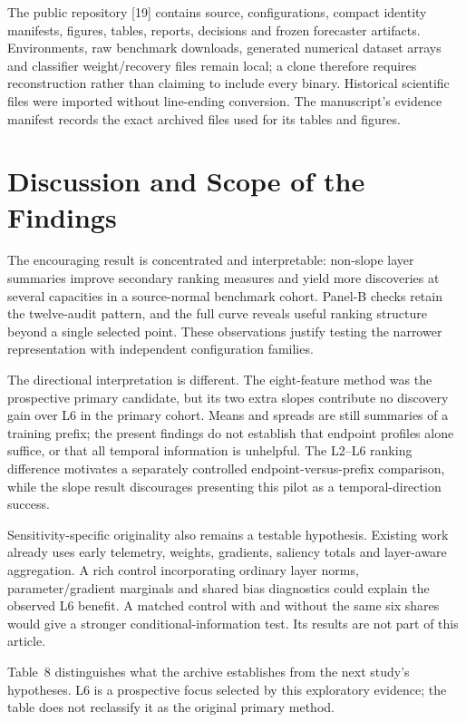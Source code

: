 The public repository [19] contains source, configurations, compact identity manifests, figures, tables, reports, decisions and frozen forecaster artifacts. Environments, raw benchmark downloads, generated numerical dataset arrays and classifier weight/recovery files remain local; a clone therefore requires reconstruction rather than claiming to include every binary. Historical scientific files were imported without line-ending conversion. The manuscript's evidence manifest records the exact archived files used for its tables and figures.

\section{Discussion and Scope of the Findings}
\label{sec:discussion}
The encouraging result is concentrated and interpretable: non-slope layer summaries improve secondary ranking measures and yield more discoveries at several capacities in a source-normal benchmark cohort. Panel-B checks retain the twelve-audit pattern, and the full curve reveals useful ranking structure beyond a single selected point. These observations justify testing the narrower representation with independent configuration families.

The directional interpretation is different. The eight-feature method was the prospective primary candidate, but its two extra slopes contribute no discovery gain over L6 in the primary cohort. Means and spreads are still summaries of a training prefix; the present findings do not establish that endpoint profiles alone suffice, or that all temporal information is unhelpful. The L2--L6 ranking difference motivates a separately controlled endpoint-versus-prefix comparison, while the slope result discourages presenting this pilot as a temporal-direction success.

Sensitivity-specific originality also remains a testable hypothesis. Existing work already uses early telemetry, weights, gradients, saliency totals and layer-aware aggregation. A rich control incorporating ordinary layer norms, parameter/gradient marginals and shared bias diagnostics could explain the observed L6 benefit. A matched control with and without the same six shares would give a stronger conditional-information test. Its results are not part of this article.

Table~8 distinguishes what the archive establishes from the next study's hypotheses. L6 is a prospective focus selected by this exploratory evidence; the table does not reclassify it as the original primary method.

